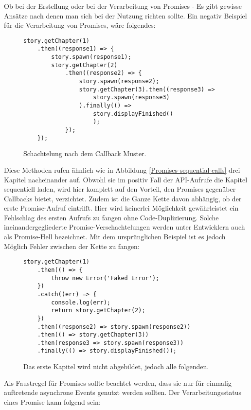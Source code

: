 Ob bei der Erstellung oder bei der Verarbeitung von Promises - Es gibt gewisse Ansätze nach denen man sich bei der Nutzung richten sollte. Ein negativ Beispiel für die Verarbeitung von Promises, wäre folgendes:

\begin{figure}[H]
\begin{lstlisting}[basicstyle=\small]
story.getChapter(1)
    .then((response1) => {
        story.spawn(response1);
        story.getChapter(2)
            .then((response2) => {
                story.spawn(response2);
                story.getChapter(3).then((response3) =>
                    story.spawn(response3)
                ).finally(() => 
                    story.displayFinished()
                    );
            });
    });
\end{lstlisting}
\caption{Schachtelung nach dem Callback Muster.}
\end{figure}

\noindent
Diese Methoden rufen ähnlich wie in Abbildung \ref{Promises-sequential-calls} drei Kapitel nacheinander auf. Obwohl sie im positiv Fall der API-Aufrufe die Kapitel sequentiell laden, wird hier komplett auf den Vorteil, den Promises gegenüber Callbacks bietet, verzichtet. Zudem ist die Ganze Kette davon abhängig, ob der erste Promise-Aufruf eintrifft. Hier wird keinerlei Möglichkeit gewährleistet ein Fehlschlag des ersten Aufrufs zu fangen ohne Code-Duplizierung. Solche ineinandergegliederte Promise-Verschachtelungen werden unter Entwicklern auch als \glqq{}Promise-Hell\grqq{} bezeichnet.
Mit dem ursprünglichen Beispiel ist es jedoch Möglich Fehler zwischen der Kette zu fangen:

\begin{figure}[H]
\begin{lstlisting}[basicstyle=\small]
story.getChapter(1)
    .then(() => {
        throw new Error('Faked Error');
    })
    .catch((err) => {
        console.log(err);
        return story.getChapter(2);
    })
    .then((response2) => story.spawn(response2))
    .then(() => story.getChapter(3))
    .then(response3 => story.spawn(response3))
    .finally(() => story.displayFinished());
\end{lstlisting}
\caption{Das erste Kapitel wird nicht abgebildet, jedoch alle folgenden.}
\end{figure}

\noindent
Als Faustregel für Promises sollte beachtet werden, dass sie nur für einmalig auftretende asynchrone Events genutzt werden sollten. Der Verarbeitungsstatus eines Promise kann folgend sein:

